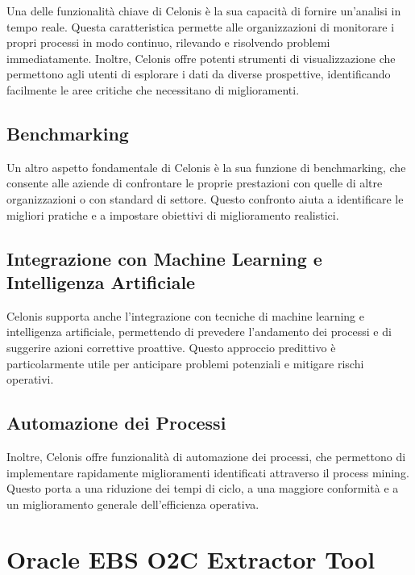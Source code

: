 \documentclass{article}
\begin{document}
Una delle funzionalità chiave di Celonis è la sua capacità di fornire un'analisi in tempo reale. Questa caratteristica permette alle organizzazioni di monitorare i propri processi in modo continuo, rilevando e risolvendo problemi immediatamente. Inoltre, Celonis offre potenti strumenti di visualizzazione che permettono agli utenti di esplorare i dati da diverse prospettive, identificando facilmente le aree critiche che necessitano di miglioramenti.

\subsection{Benchmarking}

Un altro aspetto fondamentale di Celonis è la sua funzione di benchmarking, che consente alle aziende di confrontare le proprie prestazioni con quelle di altre organizzazioni o con standard di settore. Questo confronto aiuta a identificare le migliori pratiche e a impostare obiettivi di miglioramento realistici.

\subsection{Integrazione con Machine Learning e Intelligenza Artificiale}

Celonis supporta anche l'integrazione con tecniche di machine learning e intelligenza artificiale, permettendo di prevedere l'andamento dei processi e di suggerire azioni correttive proattive. Questo approccio predittivo è particolarmente utile per anticipare problemi potenziali e mitigare rischi operativi.

\subsection{Automazione dei Processi}

Inoltre, Celonis offre funzionalità di automazione dei processi, che permettono di implementare rapidamente miglioramenti identificati attraverso il process mining. Questo porta a una riduzione dei tempi di ciclo, a una maggiore conformità e a un miglioramento generale dell'efficienza operativa.

\section{Oracle EBS O2C Extractor Tool}
\end{document}
